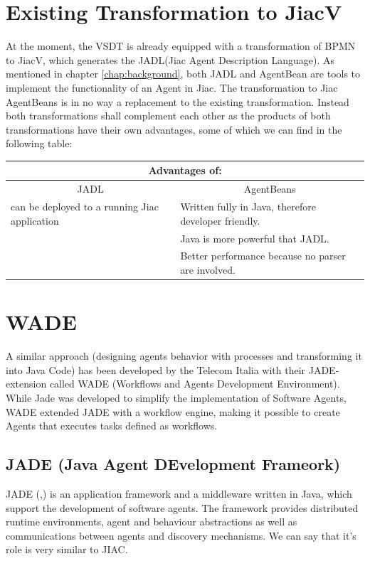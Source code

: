 \section{Existing Transformation to JiacV}
At the moment, the VSDT is already equipped with a transformation of BPMN to JiacV, which generates the JADL(Jiac Agent Description Language).
As mentioned in chapter \ref{chap:background}, both JADL and AgentBean are tools to implement the functionality of an Agent in Jiac. 
The transformation to Jiac AgentBeans is in no way a replacement to the existing transformation. Instead both transformations shall complement each other as the products of both transformations have their own advantages, some of which we can find in the following table:
\begin{table}[htbp]
	\centering
		\begin{tabularx}{\linewidth}{|l|X|}\hline\hline
			\multicolumn{2}{|c|}{\textbf{Advantages of:}} \\\hline
			\multicolumn{1}{|c|}{JADL} & \multicolumn{1}{c|}{AgentBeans}\\\hline
			can be deployed to a running Jiac application &  Written fully in Java, therefore developer friendly.\\
																										&  Java is more powerful that JADL.\\
			                           										&  Better performance because no parser are involved.\\\hline\hline
		\end{tabularx}
\end{table}

\newpage
\section{WADE}
A similar approach (designing agents behavior with processes and transforming it into Java Code) has been developed by the Telecom Italia with their JADE-extension called WADE (Workflows and Agents Development Environment). While Jade was developed to simplify the implementation of Software Agents, WADE extended JADE with a workflow engine, making it possible to create Agents that executes tasks defined as workflows.

\subsection{JADE (\textbf{J}ava \textbf{A}gent \textbf{DE}velopment Frameork)}
JADE (\cite{FBGCAPGR08},\cite{FBAPGR99}) is an application framework and a middleware written in Java, which support the development of software agents. The framework  provides distributed runtime environments, agent and behaviour abstractions as well as communications between agents and discovery mechanisms. We can say that it's role is very similar to JIAC.

